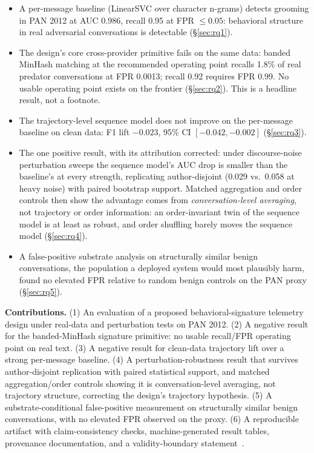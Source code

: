 \documentclass[letterpaper,twocolumn,10pt]{article}
\begin{document}
\begin{itemize}
\item A per-message baseline (LinearSVC over character n-grams) detects
grooming in PAN 2012 at AUC 0.986, recall 0.95 at FPR $\leq 0.05$:
behavioral structure in real adversarial conversations is detectable
(\S\ref{sec:rq1}).
\item The design's core cross-provider primitive fails on the same data:
banded MinHash matching at the recommended operating point recalls 1.8\% of
real predator conversations at FPR 0.0013; recall 0.92 requires FPR 0.99.
No usable operating point exists on the frontier (\S\ref{sec:rq2}). This is
a headline result, not a footnote.
\item The trajectory-level sequence model does not improve on the
per-message baseline on clean data: F1 lift $-0.023$, 95\% CI
$[-0.042, -0.002]$ (\S\ref{sec:rq3}).
\item The one positive result, with its attribution corrected: under
discourse-noise perturbation sweeps the sequence model's AUC drop is smaller
than the baseline's at every strength, replicating author-disjoint
(0.029 vs.\ 0.058 at heavy noise) with paired bootstrap support. Matched
aggregation and order controls then show the advantage comes from
\emph{conversation-level averaging}, not trajectory or order information:
an order-invariant twin of the sequence model is at least as robust, and
order shuffling barely moves the sequence model (\S\ref{sec:rq4}).
\item A false-positive substrate analysis on structurally similar benign
conversations, the population a deployed system would most plausibly harm,
found no elevated FPR relative to random benign controls on the PAN
proxy (\S\ref{sec:rq5}).
\end{itemize}

\textbf{Contributions.}
(1) An evaluation of a proposed behavioral-signature telemetry design under
real-data and perturbation tests on PAN 2012.
(2) A negative result for the banded-MinHash signature primitive: no usable
recall/FPR operating point on real text.
(3) A negative result for clean-data trajectory lift over a strong
per-message baseline.
(4) A perturbation-robustness result that survives author-disjoint
replication with paired statistical support, and matched aggregation/order
controls showing it is conversation-level averaging, not trajectory
structure, correcting the design's trajectory hypothesis.
(5) A substrate-conditional false-positive measurement on structurally
similar benign conversations, with no elevated FPR observed on the proxy.
(6) A reproducible artifact with claim-consistency checks, machine-generated
result tables, provenance documentation, and a validity-boundary
statement~\cite{artifact2026}.
\end{document}
